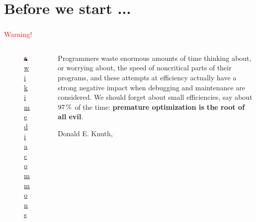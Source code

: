 \documentclass[9pt,xcolor=table]{beamer}
\begin{document}
\section*{Before we start ...}
\begin{frame}
\frametitle{\insertsection{}}
\begin{center}
  \huge\textcolor{red}{Warning!}
\end{center}
\begin{columns}[c]
  \begin{column}{.35\textwidth}
    \begin{figure}[htb]
      \includegraphics[width=\textwidth]{img/KnuthAtOpenContentAlliance}\\[6pt]
      \small\href{http://commons.wikimedia.org/wiki/File:KnuthAtOpenContentAlliance.jpg}{wikimedia commons}
    \end{figure}
  \end{column}
  \begin{column}{.6\textwidth}
    \large
    Programmers waste enormous amounts of time thinking about, or worrying about, the speed of noncritical parts of their programs, and these attempts at efficiency actually have a strong negative impact when debugging and maintenance are considered. We should forget about small efficiencies, say about $\unit[97]{\%}$ of the time: \textbf{premature optimization is the root of all evil}. \\[12pt]
    \begin{raggedright}
      \small{Donald E. Knuth, \cite{Knuth74structuredprogramming}}
    \end{raggedright}
  \end{column}
\end{columns}
\end{frame}
\end{document}
